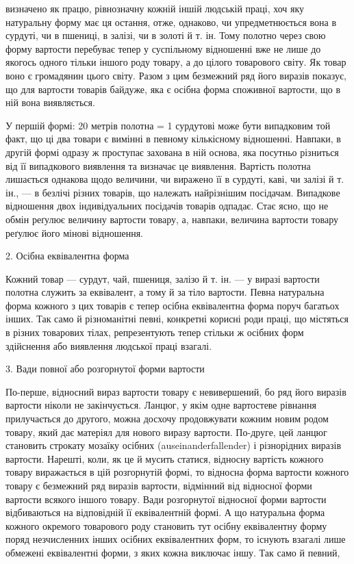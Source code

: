 \parcont{}  %
визначено як працю, рівнозначну кожній іншій людській праці,
хоч яку натуральну форму має ця остання, отже, однаково, чи
упредметнюється вона в сурдуті, чи в пшениці, в залізі, чи в
золоті й т. ін. Тому полотно через свою форму вартости перебуває
тепер у суспільному відношенні вже не лише до якогось одного
тільки іншого роду товару, а до цілого товарового світу. Як
товар воно є громадянин цього світу. Разом з цим безмежний ряд
його виразів показує, що для вартости товарів байдуже, яка є
осібна форма споживної вартости, що в ній вона виявляється.

У першій формі: 20 метрів полотна = 1 сурдутові може бути
випадковим той факт, що ці два товари є вимінні в певному кількісному
відношенні. Навпаки, в другій формі одразу ж проступає
захована в ній основа, яка посутньо різниться від її випадкового
виявлення та визначає це виявлення. Вартість полотна лишається
однакова щодо величини, чи виражено її в сурдуті, каві, чи
залізі й т. ін., — в безлічі різних товарів, що належать найрізнішим
посідачам. Випадкове відношення двох індивідуальних посідачів
товарів одпадає. Стає ясно, що не обмін реґулює величину
вартости товару, а, навпаки, величина вартости товару реґулює
його мінові відношення.

2. Осібна еквівалентна форма

Кожний товар — сурдут, чай, пшениця, залізо й т. ін. — у
виразі вартости полотна служить за еквівалент, а тому й за тіло
вартости. Певна натуральна форма кожного з цих товарів є тепер
осібна еквівалентна форма поруч багатьох інших. Так само й
різноманітні певні, конкретні корисні роди праці, що містяться
в різних товарових тілах, репрезентують тепер стільки ж осібних
форм здійснення або виявлення людської праці взагалі.

3. Вади повної або розгорнутої форми вартости

По-перше, відносний вираз вартости товару є невивершений,
бо ряд його виразів вартости ніколи не закінчується. Ланцюг, у
якім одне вартостеве рівнання прилучається до другого, можна
досхочу продовжувати кожним новим родом товару, який дає
матеріял для нового виразу вартости. По-друге, цей ланцюг становить
строкату мозаїку осібних (auseinanderfallender) і різнорідних
виразів вартости. Нарешті, коли, як це й мусить статися,
відносну вартість кожного товару виражається в цій розгорнутій
формі, то відносна форма вартости кожного товару є безмежний
ряд виразів вартости, відмінний від відносної форми вартости
всякого іншого товару. Вади розгорнутої відносної форми вартости
відбиваються на відповідній її еквівалентній формі. А що
натуральна форма кожного окремого товарового роду становить
тут осібну еквівалентну форму поряд незчисленних інших осібних
еквівалентних форм, то існують взагалі лише обмежені еквівалентні
форми, з яких кожна виключає іншу. Так само й певний,
\parbreak{}  %
